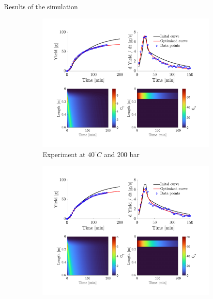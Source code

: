 \documentclass[8pt]{beamer}
\begin{document}
	\begin{frame}[fragile]{Results of the simulation}
		\begin{figure}[!h]
			\centering
			\begin{subfigure}[b]{0.49\textwidth}
				\centering
				\includegraphics[trim = 2cm 10.5cm 2.5cm 2.02cm,clip,width=\textwidth]{Figures/Fitting_LUKE_T40_P200.pdf}
				\caption{Experiment at $40^\circ C$ and $200$ bar}
			\end{subfigure}
			\hfill
			\begin{subfigure}[b]{0.49\textwidth}
				\centering
				\includegraphics[trim = 2cm 10.5cm 2.5cm 2.02cm,clip,width=\textwidth]{Figures/Fitting_LUKE_T50_P200.pdf}

\end{subfigure}
\end{figure}
\end{frame}
\end{document}
